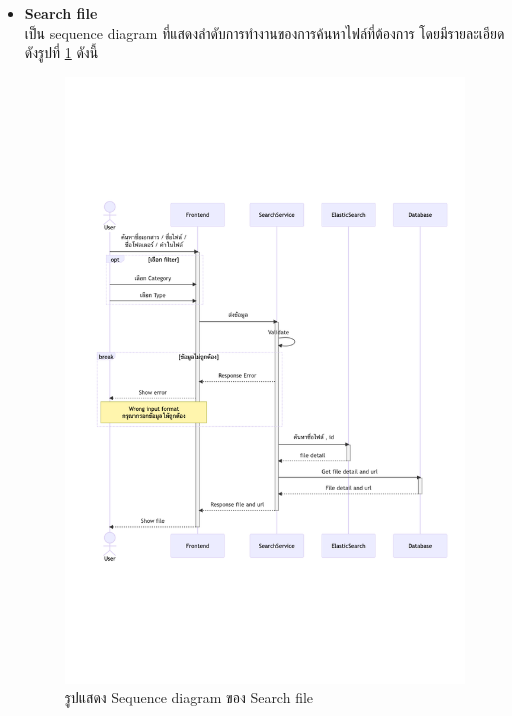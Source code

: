 \documentclass[12pt,oneside,openright,a4paper]{cpe-thai-project}
\begin{document}
\begin{itemize}
    \newpage
    \item \textbf{Search file} \\
    เป็น sequence diagram ที่แสดงลำดับการทำงานของการค้นหาไฟล์ที่ต้องการ โดยมีรายละเอียดดังรูปที่ \ref{fig:sqSearchFile} ดังนี้
    \begin{figure}[!ht]\centering
        \includegraphics[width=15cm, trim={1cm 7.2cm 0.5cm 7.3cm},clip]{./assets/sequence-diagram/search-file.png}
        \caption{รูปแสดง Sequence diagram ของ Search file}\label{fig:sqSearchFile}
    \end{figure}


\end{itemize}
\end{document}
